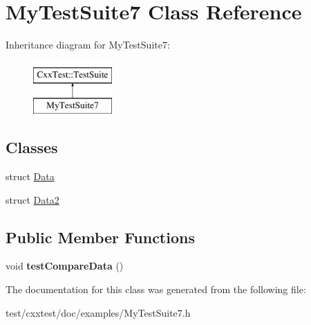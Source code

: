 \hypertarget{classMyTestSuite7}{\section{My\-Test\-Suite7 Class Reference}
\label{classMyTestSuite7}
}
Inheritance diagram for My\-Test\-Suite7\-:\begin{figure}[H]
\begin{center}
\leavevmode
\includegraphics[height=2.000000cm]{classMyTestSuite7}
\end{center}
\end{figure}
\subsection*{Classes}
\begin{DoxyCompactItemize}
\item 
struct \hyperlink{structMyTestSuite7_1_1Data}{Data}
\item 
struct \hyperlink{structMyTestSuite7_1_1Data2}{Data2}
\end{DoxyCompactItemize}
\subsection*{Public Member Functions}
\begin{DoxyCompactItemize}
\item 
\hypertarget{classMyTestSuite7_ae81db0e36620d517f2008c36c337295e}{void {\bfseries test\-Compare\-Data} ()}\label{classMyTestSuite7_ae81db0e36620d517f2008c36c337295e}

\end{DoxyCompactItemize}


The documentation for this class was generated from the following file\-:\begin{DoxyCompactItemize}
\item 
test/cxxtest/doc/examples/My\-Test\-Suite7.\-h\end{DoxyCompactItemize}
